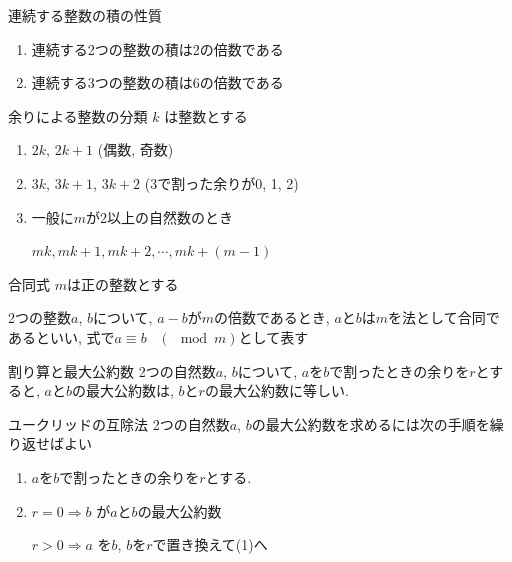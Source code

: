 \documentclass[aspectratio=169, 12pt]{beamer} %
\begin{document}
\begin{frame}{連続する整数の積の性質}
    \begin{enumerate}
        \item 連続する2つの整数の積は2の倍数である
        \item 連続する3つの整数の積は6の倍数である
    \end{enumerate}
\end{frame}
\begin{frame}{余りによる整数の分類 }
    $k$ は整数とする
    \begin{enumerate}
        \item $2k$, $2k+1$ (偶数, 奇数)
        \item $3k$, $3k+1$, $3k+2$ (3で割った余りが0, 1, 2)
        \item 一般に$m$が2以上の自然数のとき \par
              $mk, mk+1, mk+2, \cdots , mk+(m-1)$
    \end{enumerate}
\end{frame}
\begin{frame}{合同式}
    $m$は正の整数とする\par
    2つの整数$a$, $b$について, $a-b$が$m$の倍数であるとき, $a$と$b$は$m$を法として合同であるといい, 式で$a \equiv b \;\;\;(\mod m)$として表す
\end{frame}
\begin{frame}{割り算と最大公約数}
    2つの自然数$a$, $b$について, $a$を$b$で割ったときの余りを$r$とすると, $a$と$b$の最大公約数は, $b$と$r$の最大公約数に等しい.
\end{frame}
\begin{frame}{ユークリッドの互除法}
    2つの自然数$a$, $b$の最大公約数を求めるには次の手順を繰り返せばよい
    \begin{enumerate}
        \item $a$を$b$で割ったときの余りを$r$とする.
        \item $r=0\Rightarrow b$ が$a$と$b$の最大公約数 \par
              $r>0 \Rightarrow a$ を$b$, $b$を$r$で置き換えて(1)へ
    \end{enumerate}
\end{frame}
\end{document}
